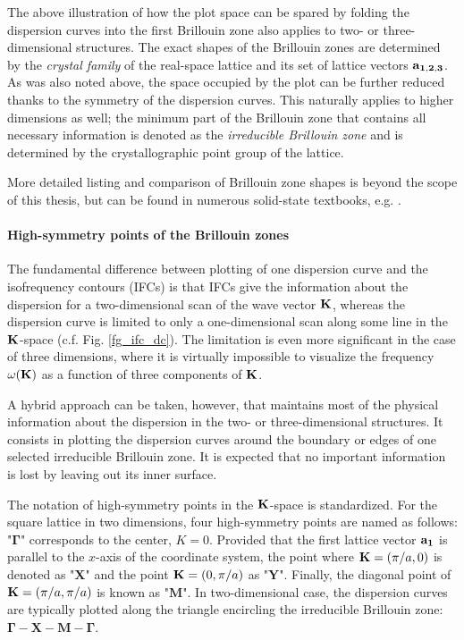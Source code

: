 The above illustration of how the plot space can be spared by folding the dispersion curves into the first Brillouin zone also applies to two- or three-dimensional structures.
The exact shapes of the Brillouin zones are determined by the \textit{crystal family} of the real-space lattice and its set of lattice vectors ${\mathbf{a_{1,2,3}}}$. 
As was also noted above, the space occupied by the plot can be further reduced thanks to the symmetry of the dispersion curves. This naturally applies to higher dimensions as well; the minimum part of the Brillouin zone that contains all necessary information is denoted as the \textit{irreducible Brillouin zone} and is determined by the crystallographic point group of the lattice. 

More detailed listing and comparison of Brillouin zone shapes is beyond the scope of this thesis, but can be found in numerous solid-state textbooks, e.g. \cite[pp. 96-99]{klingshirn2007semiconductor}. %

\paragraph{High-symmetry points of the Brillouin zones} %
The fundamental difference between plotting of one dispersion curve and the isofrequency contours (IFCs) is that IFCs give the information about the dispersion for a two-dimensional scan of the wave vector ${\mathbf{K}}$, whereas the dispersion curve is limited to only a one-dimensional scan along some line in the ${\mathbf{K}}$-space (c.f. Fig. \ref{fg_ifc_dc}). The limitation is even more significant in the case of three dimensions, where it is virtually impossible to visualize the frequency $\omega({\mathbf{K}})$ as a function of three components of ${\mathbf{K}}$.

A hybrid approach can be taken, however, that maintains most of the physical information about the dispersion in the two- or three-dimensional structures. It consists in plotting the  dispersion curves around the boundary or edges of one selected irreducible Brillouin zone. It is expected that no important information is lost by leaving out its inner surface.

The notation of high-symmetry points in the ${\mathbf{K}}$-space is standardized. For the square lattice in two dimensions, four high-symmetry points are named as follows: "$\mathbf{\Gamma}$" corresponds to the center, $K=0$. Provided that the first lattice vector ${\mathbf{a_1}}$ is parallel to the $x$-axis of the coordinate system, the point where ${\mathbf{K}} = (\pi/a, 0)$ is denoted as  "$\mathbf{X}$" and the point ${\mathbf{K}} = (0, \pi/a)$ as "$\mathbf{Y}$". Finally, the diagonal point of ${\mathbf{K}} = (\pi/a, \pi/a)$ is known as "$\mathbf{M}$".
In two-dimensional case, the dispersion curves are typically plotted along the triangle encircling the irreducible Brillouin zone: $\mathbf{\Gamma}-\mathbf{X}-\mathbf{M}-\mathbf{\Gamma}$.

